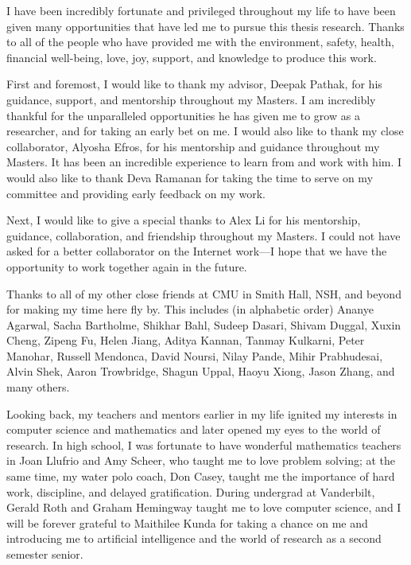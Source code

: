 \begin{acknowledgments}
    I have been incredibly fortunate and privileged throughout my life to have been given many opportunities that have led me to pursue this thesis research. Thanks to all of the people who have provided me with the environment, safety, health, financial well-being, love, joy, support, and knowledge to produce this work.

    First and foremost, I would like to thank my advisor, Deepak Pathak, for his guidance, support, and mentorship throughout my Masters.
    I am incredibly thankful for the unparalleled opportunities he has given me to grow as a researcher, and for taking an early bet on me.
    I would also like to thank my close collaborator, Alyosha Efros, for his mentorship and guidance throughout my Masters. It has been an incredible experience to learn from and work with him.
    I would also like to thank Deva Ramanan for taking the time to serve on my committee and providing early feedback on my work.

    Next, I would like to give a special thanks to Alex Li for his mentorship, guidance, collaboration, and friendship throughout my Masters. I could not have asked for a better collaborator on the Internet work---I hope that we have the opportunity to work together again in the future.

    Thanks to all of my other close friends at CMU in Smith Hall, NSH, and beyond for making my time here fly by. This includes (in alphabetic order)
    Ananye Agarwal,
    Sacha Bartholme,
    Shikhar Bahl,
    Sudeep Dasari,
    Shivam Duggal,
    Xuxin Cheng,
    Zipeng Fu,
    Helen Jiang,
    Aditya Kannan,
    Tanmay Kulkarni,
    Peter Manohar,
    Russell Mendonca,
    David Noursi,
    Nilay Pande,
    Mihir Prabhudesai,
    Alvin Shek,
    Aaron Trowbridge,
    Shagun Uppal,
    Haoyu Xiong,
    Jason Zhang,
    and many others.

    Looking back, my teachers and mentors earlier in my life ignited my interests in computer science and mathematics and later opened my eyes to the world of research.
    In high school,
    I was fortunate to have wonderful mathematics teachers in
    Joan Llufrio and Amy Scheer, who taught me to love problem solving;
    at the same time, my water polo coach, Don Casey, taught me the importance of hard work, discipline, and delayed gratification.
    During undergrad at Vanderbilt,
    Gerald Roth and Graham Hemingway taught me to love computer science, and I will be forever grateful to Maithilee Kunda for taking a chance on me and introducing me to artificial intelligence and the world of research as a second semester senior.
    

\end{acknowledgments}
